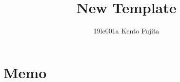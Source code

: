 \documentclass[12pt,dvipdfmx]{article}
\title{New Template}
\author{19lc001a Kento Fujita}
\theoremstyle{definition}
\theoremstyle{remark}
\numberwithin{equation}{section}
\begin{document}
\section{Memo}



    





    

\end{document}
